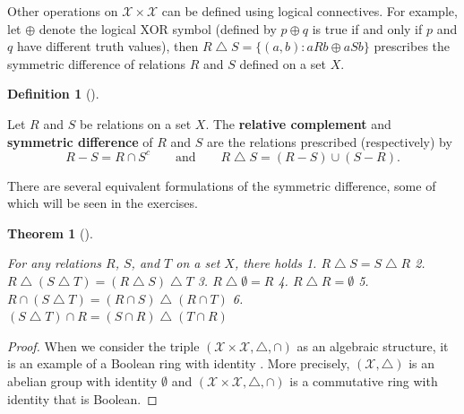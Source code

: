 \documentclass[
  letterpaper,
  10pt,
  reqno,
  twopage,
  openany]{book}
\theoremstyle{plain}
\theoremstyle{definition}
\theoremstyle{definition}
\newtheorem{definition}{Definition}[chapter]
\theoremstyle{definition}
\theoremstyle{plain}
\theoremstyle{plain}
\newtheorem{theorem}{Theorem}[chapter]
\theoremstyle{remark}
\begin{document}
Other operations on \(\mathcal{X\times X}\) can be defined using logical
connectives. For example, let \(\oplus\) denote the logical XOR symbol
(defined by \(p\oplus q\) is true if and only if \(p\) and \(q\) have
different truth values), then
\(R\bigtriangleup S = \{(a,b) : aRb \oplus aSb\}\) prescribes the
symmetric difference of relations \(R\) and \(S\) defined on a set
\(X\).

\leavevmode{}%
\begin{definition}[]\label{def-relations-symmetric-difference}

Let \(R\) and \(S\) be relations on a set \(X\). The
 \textbf{relative complement} and
 \textbf{symmetric difference} of \(R\) and
\(S\) are the relations prescribed (respectively) by \[
R - S = R\cap S^c \qquad \text{and} \qquad R\bigtriangleup S = (R-S)\cup (S-R).
\]

\end{definition}

There are several equivalent formulations of the symmetric difference,
some of which will be seen in the exercises.

\leavevmode{}%
\begin{theorem}[]\label{thm-symdiff}

For any relations \(R\), \(S\), and \(T\) on a set \(X\), there holds 1.
\(R\bigtriangleup S = S\bigtriangleup R\) 2.
\(R\bigtriangleup (S\bigtriangleup T)=(R\bigtriangleup S)\bigtriangleup T\)
3. \(R\bigtriangleup \emptyset = R\) 4. \(R\bigtriangleup R=\emptyset\)
5. \(R\cap (S\bigtriangleup T)=(R\cap S)\bigtriangleup (R\cap T)\) 6.
\((S\bigtriangleup T)\cap R=(S\cap R)\bigtriangleup (T\cap R)\)

\end{theorem}

\begin{proof}

When we consider the triple
\((\mathcal{X\times X},\bigtriangleup,\cap)\) as an algebraic structure,
it is an example of a Boolean ring with identity \cite{MR1501865}. More
precisely, \((\mathcal{X},\bigtriangleup)\) is an abelian group with
identity \(\emptyset\) and \((\mathcal{X\times X},\bigtriangleup,\cap)\)
is a commutative ring with identity that is Boolean.

\end{proof}
\end{document}
